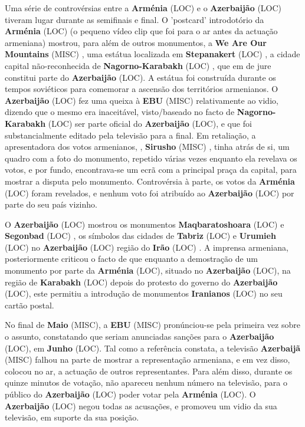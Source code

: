 \documentclass[12pt,a4paper]{article}
\begin{document}
Uma série de controvérsias entre a \textbf{Arménia} (LOC) e o \textbf{Azerbaijão} (LOC) tiveram lugar durante as semifinais e final. O 'postcard' introdotório da \textbf{Arménia} (LOC) (o pequeno vídeo clip que foi para o ar antes da actuação armeniana) mostrou, para além de outros monumentos, a \textbf{We Are Our Mountains} (MISC) , uma estátua localizada em \textbf{Stepanakert} (LOC) , a cidade capital não-reconhecida de \textbf{Nagorno-Karabakh} (LOC) , que em de jure constitui parte do \textbf{Azerbaijão} (LOC). A estátua foi construída durante os tempos soviéticos para comemorar a ascensão dos territórios armenianos. O \textbf{Azerbaijão} (LOC) fez uma queixa à \textbf{EBU} (MISC) relativamente ao vidio, dizendo que o mesmo era inaceitável, visto/baseado no facto de \textbf{Nagorno-Karabakh} (LOC) ser parte oficial do \textbf{Azerbaijão} (LOC), e que foi substancialmente editado pela televisão para a final. Em retaliação, a apresentadora dos votos armenianos, , \textbf{Sirusho} (MISC) , tinha atrás de si, um quadro com a foto do monumento, repetido várias vezes enquanto ela revelava os votos, e por fundo, encontrava-se um ecrã com a principal praça da capital, para mostrar a disputa pelo monumento. Controvérsia à parte, os votos da \textbf{Arménia} (LOC) foram revelados, e nenhum voto foi atribuído ao \textbf{Azerbaijão} (LOC) por parte do seu país vizinho.

O \textbf{Azerbaijão} (LOC) mostrou os monumentos \textbf{Maqbaratoshoara} (LOC) e \textbf{Segonbad} (LOC) , os símbolos das cidades de \textbf{Tabriz} (LOC) e \textbf{Urumieh} (LOC) no \textbf{Azerbaijão} (LOC) região do \textbf{Irão} (LOC) . A imprensa armeniana, posteriormente criticou o facto de que enquanto a demostração de um monumento por parte da \textbf{Arménia} (LOC), situado no \textbf{Azerbaijão} (LOC), na região de \textbf{Karabakh} (LOC) depois do protesto do governo do \textbf{Azerbaijão} (LOC), este permitiu a introdução de monumentos \textbf{Iranianos} (LOC) no seu cartão postal.

No final de \textbf{Maio} (MISC), a \textbf{EBU} (MISC) pronúnciou-se pela primeira vez sobre o assunto, constatando que seriam anunciadas sanções para o \textbf{Azerbaijão} (LOC), em \textbf{Junho} (LOC). Tal como a referência constata, a televisão \textbf{Azerbaijã} (MISC) falhou na parte de mostrar a representação armeniana, e em vez disso, colocou no ar, a actuação de outros representantes. Para além disso, durante os quinze minutos de votação, não apareceu nenhum número na televisão, para o público do \textbf{Azerbaijão} (LOC) poder votar pela \textbf{Arménia} (LOC). O \textbf{Azerbaijão} (LOC) negou todas as acusações, e promoveu um vidio da sua televisão, em suporte da sua posição.
\end{document}

